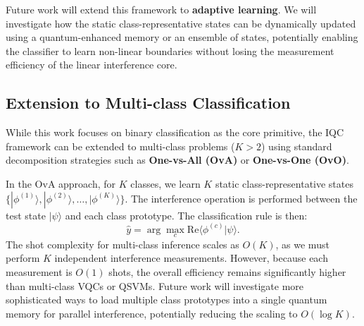\documentclass[conference]{IEEEtran}
\begin{document}
Future work will extend this framework to \textbf{adaptive learning}. We will investigate how the static class-representative states can be dynamically updated using a quantum-enhanced memory or an ensemble of states, potentially enabling the classifier to learn non-linear boundaries without losing the measurement efficiency of the linear interference core.

\subsection{Extension to Multi-class Classification}

While this work focuses on binary classification as the core primitive, the IQC framework can be extended to multi-class problems ($K > 2$) using standard decomposition strategies such as \textbf{One-vs-All (OvA)} or \textbf{One-vs-One (OvO)}.

In the OvA approach, for $K$ classes, we learn $K$ static class-representative states $\{|\phi^{(1)}\rangle, |\phi^{(2)}\rangle, \dots, |\phi^{(K)}\rangle\}$. The interference operation is performed between the test state $|\psi\rangle$ and each class prototype. The classification rule is then:
\begin{equation}
    \hat{y} = \arg\max_c \mathrm{Re}\langle \phi^{(c)} | \psi \rangle.
\end{equation}
The shot complexity for multi-class inference scales as $O(K)$, as we must perform $K$ independent interference measurements. However, because each measurement is $O(1)$ shots, the overall efficiency remains significantly higher than multi-class VQCs or QSVMs. Future work will investigate more sophisticated ways to load multiple class prototypes into a single quantum memory for parallel interference, potentially reducing the scaling to $O(\log K)$.
\end{document}

